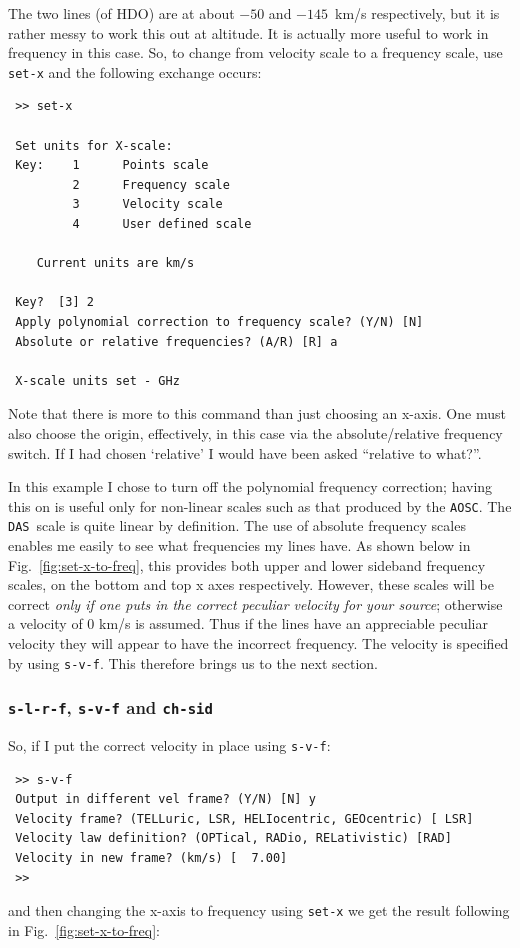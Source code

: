 \documentclass[11pt,twoside]{article}
\newcommand{\das}{{\tt DAS}}
\newcommand{\aosc}{{\tt AOSC}}
\begin{document}
The two lines (of HDO) are at about $-50$ and $-145$~km/s
respectively, but it is rather messy to work this out at altitude.  It
is actually more useful to work in frequency in this case. So,
to change from velocity scale to a frequency scale, use {\tt set-x}
and the following exchange occurs:

\begin{verbatim}
 >> set-x

 Set units for X-scale:
 Key:    1      Points scale
         2      Frequency scale
         3      Velocity scale
         4      User defined scale

    Current units are km/s

 Key?  [3] 2
 Apply polynomial correction to frequency scale? (Y/N) [N]
 Absolute or relative frequencies? (A/R) [R] a

 X-scale units set - GHz
\end{verbatim}

Note that there is more to this command than just choosing an
x-axis. One must also choose the origin, effectively, in this case via
the absolute/relative frequency switch. If I had chosen `relative' I
would have been asked ``relative to what?''.

In this example I chose to turn off the polynomial frequency
correction; having this on is useful only for non-linear scales such as
that produced
by the \aosc . The \das\ scale is quite linear by definition. The use
of absolute frequency scales enables me easily to see what frequencies
my lines have. As shown below in Fig.~\ref{fig:set-x-to-freq},
this provides both upper and lower
sideband frequency scales, on the bottom and top x axes
respectively. However, these scales will be correct {\it only if one
puts in the correct peculiar velocity for your source}; otherwise a
velocity of 0 km/s is assumed. Thus if the lines have an appreciable
peculiar velocity they will appear to have the incorrect
frequency. The velocity is specified by using {\tt s-v-f}. This
therefore brings us to the next section.

\subsubsection{{\tt s-l-r-f}, {\tt s-v-f} and {\tt ch-sid}}
\label{sec:s-l-r-f}
So, if I put the correct velocity in place using {\tt s-v-f}:
\begin{verbatim}
 >> s-v-f
 Output in different vel frame? (Y/N) [N] y
 Velocity frame? (TELLuric, LSR, HELIocentric, GEOcentric) [ LSR]
 Velocity law definition? (OPTical, RADio, RELativistic) [RAD]
 Velocity in new frame? (km/s) [  7.00]
 >>
\end{verbatim}
and then changing the x-axis to frequency using {\tt set-x} we get the
result following in Fig.~\ref{fig:set-x-to-freq}:
\end{document}
